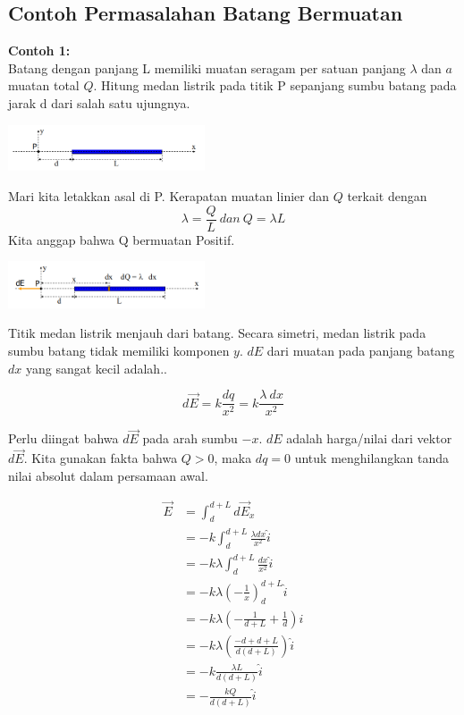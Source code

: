 \documentclass[twocolumn, 11pt]{article}%
\begin{document}
    \subsection{Contoh Permasalahan Batang Bermuatan}%
    \textbf{Contoh 1:}\\
    Batang dengan panjang L memiliki muatan seragam per satuan panjang $\lambda$ dan $a$ muatan total $Q$. Hitung medan listrik pada titik P sepanjang sumbu batang pada jarak d dari salah satu ujungnya.

    \begin{center}
        \includegraphics[width=220px]{7.png}
    \end{center}
    Mari kita letakkan asal di P. Kerapatan muatan linier dan $Q$ terkait dengan
        \[ \lambda=\frac{Q}{L}\ dan\ Q=\lambda L \]
    Kita anggap bahwa Q bermuatan Positif.

    \begin{center}
        \includegraphics[width=220px]{8.png}
    \end{center}

    Titik medan listrik menjauh dari batang. Secara simetri, medan listrik pada sumbu batang tidak memiliki komponen $y$. $dE$ dari muatan pada panjang batang $dx$ yang sangat kecil adalah..

    \[ d \vec E=k\frac{dq}{x^2}=k\frac{\lambda\ dx}{x^2} \]

    Perlu diingat bahwa $d \vec E$ pada arah sumbu $-x$. $dE$ adalah harga/nilai dari vektor $d \vec E$. Kita gunakan fakta bahwa $Q>0$, maka $dq=0$ untuk menghilangkan tanda nilai absolut dalam persamaan awal.

    \begin{align*} 
        \vec E &= \int_d^{d+L} d\vec E_x\\
               &= -k \int_d^{d+L} \frac{\lambda dx}{x^2} \hat i\\
               &= -k \lambda \int_d^{d+L} \frac{dx}{x^2} \hat i\\
               &= -k \lambda \left( -\frac1x \right)_d^{d+L} \hat i\\
               &= -k \lambda \left( -\frac1{d+L} + \frac1d \right) \hat i\\
               &= -k \lambda \left(\frac{-d+d+L}{d(d+L)} \right) \hat i\\
               &= -k \frac{\lambda L}{d(d+L)} \hat i\\
               &= -\frac{kQ}{d(d+L)} \hat i
    \end{align*}
\end{document}

